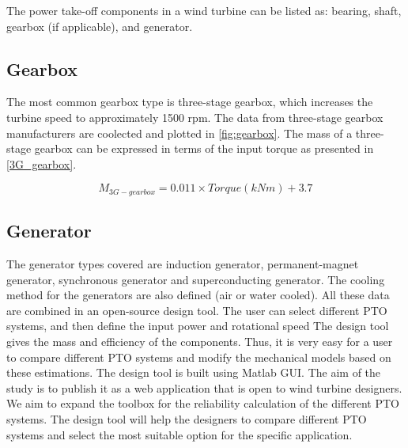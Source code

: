 \documentclass{article}
\begin{document}
The power take-off components in a wind turbine can be listed as: bearing, shaft, gearbox (if applicable), and generator. 

\subsection{Gearbox}

The most common gearbox type is three-stage gearbox, which increases the turbine speed to approximately 1500 rpm. The data from three-stage gearbox manufacturers are coolected and plotted in \autoref{fig:gearbox}.
The mass of a three-stage gearbox can be expressed in terms of the input torque as presented in \autoref{3G_gearbox}.


\begin{Schunk}
\end{Schunk}
\begin{equation}
M_{3G-gearbox} = 0.011 \times Torque(kNm) + 3.7
\label{3G_gearbox}
\end{equation}

\subsection{Generator}
The generator types covered are induction generator, permanent-magnet generator, synchronous generator and superconducting generator. The cooling method for the generators are also defined (air or water cooled). 
All these data are combined in an open-source design tool. The user can select different PTO systems, and then define the input power and rotational speed The design tool gives the mass and efficiency of the components. Thus, it is very easy for a user to compare different PTO systems and modify the mechanical models based on these estimations. The design tool is built using Matlab GUI. The aim of the study is to publish it as a web application that is open to wind turbine designers. We aim to expand the toolbox for the reliability calculation of the different PTO systems. The design tool will help the designers to compare different PTO systems and select the most suitable option for the specific application.
\end{document}
